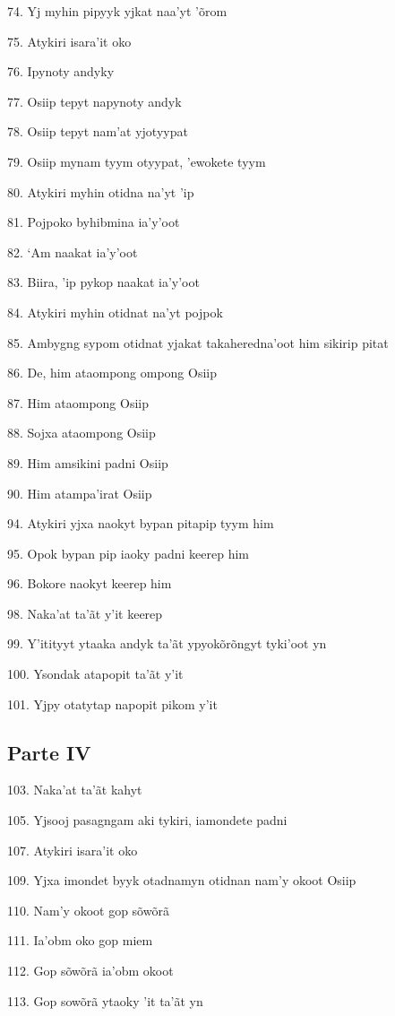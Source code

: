 74. Yj myhin pipyyk yjkat naa'yt 'õrom

75. Atykiri isara'it oko

76. Ipynoty andyky

77. Osiip tepyt napynoty andyk

78. Osiip tepyt nam'at yjotyypat

79. Osiip mynam tyym otyypat, 'ewokete tyym

80. Atykiri myhin otidna na'yt 'ip

81. Pojpoko byhibmina ia'y'oot

82. `Am naakat ia'y'oot

83. Biira, 'ip pykop naakat ia'y'oot

84. Atykiri myhin otidnat na'yt pojpok

85. Ambygng sypom otidnat yjakat takaheredna'oot him sikirip pitat

86. De, him ataompong ompong Osiip

87. Him ataompong Osiip

88. Sojxa ataompong Osiip

89. Him amsikini padni Osiip

90. Him atampa'irat Osiip

94. Atykiri yjxa naokyt bypan pitapip tyym him

95. Opok bypan pip iaoky padni keerep him

96. Bokore naokyt keerep him

98. Naka'at ta'ãt y'it keerep

99. Y'itityyt ytaaka andyk ta'ãt ypyokõrõngyt tyki'oot yn

100. Ysondak atapopit ta'ãt y'it

101. Yjpy otatytap napopit pikom y'it

\subsection{Parte IV}

103. Naka'at ta'ãt kahyt

105. Yjsooj pasagngam aki tykiri, iamondete padni

107. Atykiri isara'it oko

109. Yjxa imondet byyk otadnamyn otidnan nam'y okoot Osiip

110. Nam'y okoot gop sõwõrã

111. Ia'obm oko gop miem

112. Gop sõwõrã ia'obm okoot

113. Gop sowõrã ytaoky 'it ta'ãt yn

